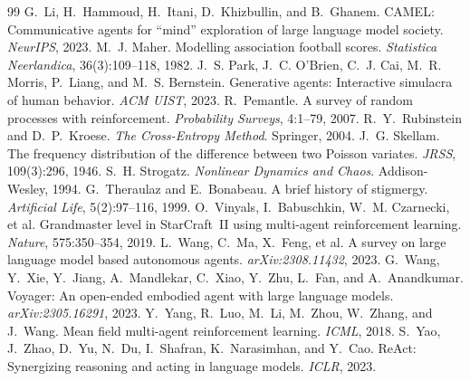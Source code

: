 \documentclass[11pt,UTF8,fontset=fandol]{ctexart}
\theoremstyle{plain}
\theoremstyle{definition}
\theoremstyle{remark}
\begin{document}
\begin{thebibliography}{99}
 G.~Li, H.~Hammoud, H.~Itani, D.~Khizbullin, and B.~Ghanem. CAMEL: Communicative agents for ``mind'' exploration of large language model society. \emph{NeurIPS}, 2023.
 M.~J. Maher. Modelling association football scores. \emph{Statistica Neerlandica}, 36(3):109--118, 1982.
 J.~S. Park, J.~C. O'Brien, C.~J. Cai, M.~R. Morris, P.~Liang, and M.~S. Bernstein. Generative agents: Interactive simulacra of human behavior. \emph{ACM UIST}, 2023.
 R.~Pemantle. A survey of random processes with reinforcement. \emph{Probability Surveys}, 4:1--79, 2007.
 R.~Y.~Rubinstein and D.~P.~Kroese. \emph{The Cross-Entropy Method}. Springer, 2004.
 J.~G. Skellam. The frequency distribution of the difference between two Poisson variates. \emph{JRSS}, 109(3):296, 1946.
 S.~H. Strogatz. \emph{Nonlinear Dynamics and Chaos}. Addison-Wesley, 1994.
 G.~Theraulaz and E.~Bonabeau. A brief history of stigmergy. \emph{Artificial Life}, 5(2):97--116, 1999.
 O.~Vinyals, I.~Babuschkin, W.~M. Czarnecki, et al. Grandmaster level in StarCraft~II using multi-agent reinforcement learning. \emph{Nature}, 575:350--354, 2019.
 L.~Wang, C.~Ma, X.~Feng, et al. A survey on large language model based autonomous agents. \emph{arXiv:2308.11432}, 2023.
 G.~Wang, Y.~Xie, Y.~Jiang, A.~Mandlekar, C.~Xiao, Y.~Zhu, L.~Fan, and A.~Anandkumar. Voyager: An open-ended embodied agent with large language models. \emph{arXiv:2305.16291}, 2023.
 Y.~Yang, R.~Luo, M.~Li, M.~Zhou, W.~Zhang, and J.~Wang. Mean field multi-agent reinforcement learning. \emph{ICML}, 2018.
 S.~Yao, J.~Zhao, D.~Yu, N.~Du, I.~Shafran, K.~Narasimhan, and Y.~Cao. ReAct: Synergizing reasoning and acting in language models. \emph{ICLR}, 2023.
\end{thebibliography}
\end{document}
